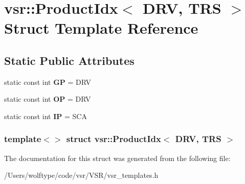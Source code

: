 \hypertarget{structvsr_1_1_product_idx_3_01_d_r_v_00_01_t_r_s_01_4}{\section{vsr\-:\-:Product\-Idx$<$ D\-R\-V, T\-R\-S $>$ Struct Template Reference}
\label{structvsr_1_1_product_idx_3_01_d_r_v_00_01_t_r_s_01_4}
}
\subsection*{Static Public Attributes}
\begin{DoxyCompactItemize}
\item 
\hypertarget{structvsr_1_1_product_idx_3_01_d_r_v_00_01_t_r_s_01_4_a1e89b2566d487ba3b8e5be1e9e9fa266}{static const int {\bfseries G\-P} = D\-R\-V}\label{structvsr_1_1_product_idx_3_01_d_r_v_00_01_t_r_s_01_4_a1e89b2566d487ba3b8e5be1e9e9fa266}

\item 
\hypertarget{structvsr_1_1_product_idx_3_01_d_r_v_00_01_t_r_s_01_4_a263f65fe27f7744fa5362c32d21c1377}{static const int {\bfseries O\-P} = D\-R\-V}\label{structvsr_1_1_product_idx_3_01_d_r_v_00_01_t_r_s_01_4_a263f65fe27f7744fa5362c32d21c1377}

\item 
\hypertarget{structvsr_1_1_product_idx_3_01_d_r_v_00_01_t_r_s_01_4_acb4fc251cc3141508ad26d732b162351}{static const int {\bfseries I\-P} = S\-C\-A}\label{structvsr_1_1_product_idx_3_01_d_r_v_00_01_t_r_s_01_4_acb4fc251cc3141508ad26d732b162351}

\end{DoxyCompactItemize}
\subsubsection*{template$<$$>$ struct vsr\-::\-Product\-Idx$<$ D\-R\-V, T\-R\-S $>$}



The documentation for this struct was generated from the following file\-:\begin{DoxyCompactItemize}
\item 
/\-Users/wolftype/code/vsr/\-V\-S\-R/vsr\-\_\-templates.\-h\end{DoxyCompactItemize}

